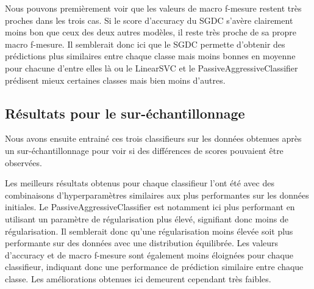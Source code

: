 \documentclass[11pt]{article}
\begin{document}
Nous pouvons premièrement voir que les valeurs de macro f-mesure restent très proches dans les trois cas. Si le score d'accuracy du SGDC s'avère clairement moins bon que ceux des deux autres modèles, il reste très proche de sa propre macro f-mesure. Il semblerait donc ici que le SGDC permette d'obtenir des prédictions plus similaires entre chaque classe mais moins bonnes en moyenne pour chacune d'entre elles là ou le LinearSVC et le PassiveAggressiveClassifier prédisent mieux certaines classes mais bien moins d'autres.

\subsection{Résultats pour le sur-échantillonnage}

Nous avons ensuite entrainé ces trois classifieurs sur les données obtenues après un sur-échantillonnage pour voir si des différences de scores pouvaient être observées.

\begin{table}[ht]
\centering
{}
\caption{Meilleurs résultats obtenus après sur-échantillonnage.}
\label{tab:pourcentage_test}
\end{table}

Les meilleurs résultats obtenus pour chaque classifieur l'ont été avec des combinaisons d'hyperparamètres similaires aux plus performantes sur les données initiales. Le PassiveAggressiveClassifier est notamment ici plus performant en utilisant un paramètre de régularisation plus élevé, signifiant donc moins de régularisation. Il semblerait donc qu'une régularisation moins élevée soit plus performante sur des données avec une distribution équilibrée. Les valeurs d'accuracy et de macro f-mesure sont également moins éloignées pour chaque classifieur, indiquant donc une performance de prédiction similaire entre chaque classe. Les améliorations obtenues ici demeurent cependant très faibles.
\end{document}
